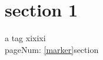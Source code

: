 \documentclass[12pt]{article}
\begin{document}
    \section{section 1}
        a tag \label{marker}
        xixixi \\
        pageNum: \pageref{marker} \ref{marker}section
\end{document}
